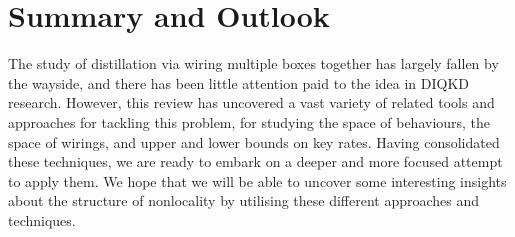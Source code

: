 \documentclass[10pt, a4paper]{article}
\numberwithin{equation}{section} %
\theoremstyle{definition}
\theoremstyle{plain}
\newcommand{\?}{\mathrel{?}} %
\begin{document}
    \section{Summary and Outlook}

    The study of distillation via wiring multiple boxes together has largely fallen by the wayside, and there has been little attention paid to the idea in DIQKD research. However, this review has uncovered a vast variety of related tools and approaches for tackling this problem, for studying the space of behaviours, the space of wirings, and upper and lower bounds on key rates. Having consolidated these techniques, we are ready to embark on a deeper and more focused attempt to apply them. We hope that we will be able to uncover some interesting insights about the structure of nonlocality by utilising these different approaches and techniques.
    \clearpage

    \printbibliography{}
    \clearpage
\end{document}
